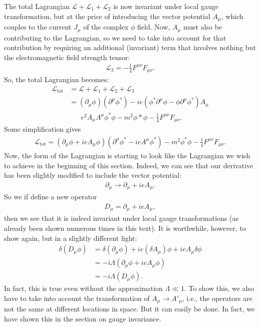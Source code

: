 \documentclass{book}
\numberwithin{equation}{section}
\theoremstyle{definition}
\newcommand{\p}{\partial}
\newcommand{\lag}{\mathcal{L}}
\begin{document}
The total Lagrangian $\lag + \lag_1 + \lag_2$ is now invariant under local gauge transformation, but at the price of introducing the vector potential $A_\mu$, which couples to the current $J_\mu$ of the complex $\phi$ field. Now, $A_\mu$ must also be contributing to the Lagrangian, so we need to take into account for that contribution by requiring an additional (invariant) term that involves nothing but the electromagnetic field strength tensor:
\begin{align}
\lag_3 = -\frac{1}{4}F^{\mu\nu}F_{\mu\nu}.
\end{align}
So, the total Lagrangian becomes:
\begin{align}
\lag_{\text{tot}} &= \lag+ \lag_1 + \lag_2 + \lag_3\\
&= (\p_\mu\phi)(\p^\mu\phi^*) -ie(\phi^*\p^\mu\phi - \phi\p^\mu\phi^*)A_\mu\\
&\,\,\,\,\,\,\,\,\,\, e^2A_\mu A^\mu \phi^*\phi - m^2 \phi*\phi - \frac{1}{4}F^{\mu\nu}F_{\mu\nu}.
\end{align}
Some simplification gives
\begin{align}
\lag_{\text{tot}} = (\p_\mu\phi + ieA_\mu\phi)(\p^\mu\phi^* - ieA^\mu\phi^*) - m^2\phi^*\phi - \frac{1}{4}F^{\mu\nu}F_{\mu\nu}.
\end{align}
Now, the form of the Lagrangian is starting to look like the Lagrangian we wish to achieve in the beginning of this section. Indeed, we can see that our derivative has been slightly modified to include the vector potential:
\begin{align}
\p_\mu \to \p_\mu + ieA_\mu.
\end{align}
So we if define a new operator
\begin{align}
D_\mu = \p_\mu + ieA_\mu,
\end{align}
then we see that it is indeed invariant under local gauge transformations (as already been shown numerous times in this text). It is worthwhile, however, to show again, but in a slightly different light:
\begin{align}
\delta(D_\mu\phi) &= \delta(\p_\mu\phi) + ie(\delta A_\mu)\phi + ieA_\mu\delta \phi\\
&= -i\Lambda (\p_\mu\phi + ieA_\mu\phi)\\
&= -i\Lambda (D_\mu\phi).
\end{align}
In fact, this is true even without the approximation $\Lambda \ll 1$. To show this, we also have to take into account the transformation of $A_\mu \to A'_\mu$, i.e., the operators are not the same at different locations in space. But it can easily be done. In fact, we have shown this in the section on gauge invariance. \\
\end{document}

